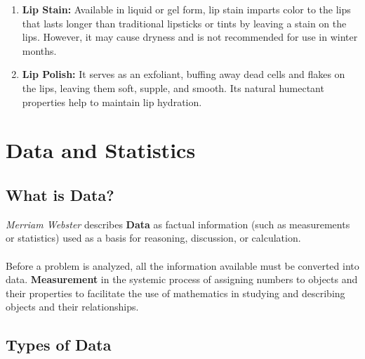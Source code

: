 \documentclass{article}
\begin{document}
\begin{enumerate}
    \item \textbf{Lip Stain:} Available in liquid or gel form, lip stain imparts color to the lips that lasts longer than traditional lipsticks or tints by leaving a stain on the lips. However, it may cause dryness and is not recommended for use in winter months.

    \item \textbf{Lip Polish:} It serves as an exfoliant, buffing away dead cells and flakes on the lips, leaving them soft, supple, and smooth. Its natural humectant properties help to maintain lip hydration.

\end{enumerate}

\newpage

\section{Data and Statistics}

\subsection{What is Data?}
\textit{Merriam Webster} describes \textbf{Data} as factual information (such as measurements or statistics) used as a basis for reasoning,  discussion, or calculation.
\\ \\
Before a problem is analyzed, all the information available must be converted into data. \textbf{Measurement} in the systemic process of assigning numbers to objects and their properties to facilitate the use of mathematics in studying and describing  objects and their relationships.

\subsection{Types of Data}
\end{document}
